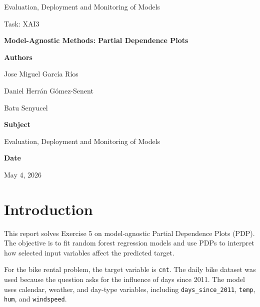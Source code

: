 \documentclass[11pt,a4paper]{article}
\begin{document}
\begin{titlepage}
\centering
\vspace*{1.5cm}

{\Large Evaluation, Deployment and Monitoring of Models\par}
\vspace{1.4cm}

{\large Task: XAI3\par}
\vspace{0.4cm}

{\LARGE\bfseries Model-Agnostic Methods: Partial Dependence Plots\par}
\vspace{1.8cm}

{\large\bfseries Authors\par}
\vspace{0.2cm}
Jose Miguel García Ríos\par
Daniel Herrán Gómez-Senent\par
Batu Senyucel\par
\vspace{1.4cm}

{\large\bfseries Subject\par}
\vspace{0.2cm}
Evaluation, Deployment and Monitoring of Models\par
\vspace{1.4cm}

{\large\bfseries Date\par}
\vspace{0.2cm}
May 4, 2026\par

\vfill
\end{titlepage}

\clearpage
{}
\tableofcontents
\newpage

\clearpage
{}

\section{Introduction}

This report solves Exercise 5 on model-agnostic Partial Dependence Plots (PDP).
The objective is to fit random forest regression models and use PDPs to interpret
how selected input variables affect the predicted target.

For the bike rental problem, the target variable is \texttt{cnt}. The daily bike
dataset was used because the question asks for the influence of days since 2011.
The model uses calendar, weather, and day-type variables, including
\texttt{days\_since\_2011}, \texttt{temp}, \texttt{hum}, and \texttt{windspeed}.
\end{document}
